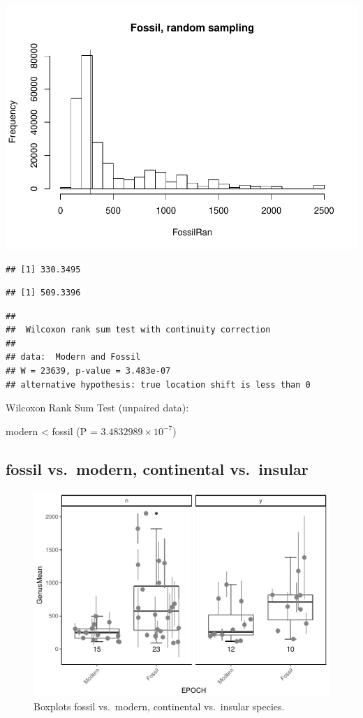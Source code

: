 \documentclass[]{article}
\begin{document}
\includegraphics{MA_JJ_files/figure-latex/RSFM-1.pdf}

\begin{verbatim}
## [1] 330.3495
\end{verbatim}

\begin{verbatim}
## [1] 509.3396
\end{verbatim}

\begin{verbatim}
## 
##  Wilcoxon rank sum test with continuity correction
## 
## data:  Modern and Fossil
## W = 23639, p-value = 3.483e-07
## alternative hypothesis: true location shift is less than 0
\end{verbatim}

Wilcoxon Rank Sum Test (unpaired data):

modern \textless{} fossil (P = \(3.4832989\times 10^{-7}\))

\newpage

\subsection{fossil vs.~modern, continental
vs.~insular}\label{fossil-vs.modern-continental-vs.insular}

\begin{figure}[htbp]
\centering
\includegraphics{MA_JJ_files/figure-latex/BPFMCI-1.pdf}
\caption{Boxplots fossil vs.~modern, continental vs.~insular species.}
\end{figure}
\end{document}
